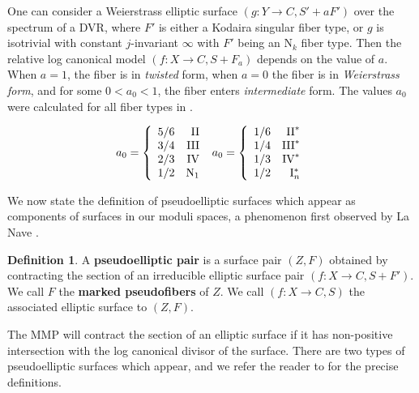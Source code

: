 \documentclass[11pt]{amsart}
\theoremstyle{definition}
\newtheorem{definition}[theorem]{Definition}
\theoremstyle{remark}
\begin{document}
	
	
	One can consider a Weierstrass elliptic surface $(g: Y \to C, S' + aF')$ over the spectrum of a DVR, where $F'$ is either a Kodaira singular fiber type, or $g$ is isotrivial with constant $j$-invariant $\infty$ with $F'$ being an $\mathrm{N}_k$ fiber type. Then the relative log canonical model $(f: X\to C, S + F_a)$ depends on the value of $a$. When $a = 1$, the fiber is in \emph{twisted} form, when $a = 0$ the fiber is in \emph{Weierstrass form}, and for some $0 < a_0 < 1$, the fiber enters \emph{intermediate} form. The values $a_0$ were calculated for all fiber types in \cite[Theorem 3.10]{master}.
	
	\begin{equation}\label{eq:a0}
		a_0 = \left\{ \begin{array}{lr}
			
			5/6 & \mathrm{II} \\ 3/4 & \mathrm{III} \\ 2/3 & \mathrm{IV} \\  1/2 & \mathrm{N}_1 \end{array}\right. \\
		\  a_0 = \left\{ \begin{array}{lr} 1/6 & \mathrm{II}^* \\ 
			1/4  & \mathrm{III}^* \\
			1/3 & \mathrm{IV}^* \\
			1/2 & \mathrm{I}_n^* \end{array}\right. 
	\end{equation}
	
	
	We now state the definition of pseudoelliptic surfaces which appear as components of surfaces in our moduli spaces, a phenomenon first observed by La Nave \cite{ln}.
	
	\begin{definition}\label{def:pseudo} A \textbf{pseudoelliptic pair} is a surface pair $(Z, F)$ obtained by contracting the section of an irreducible elliptic surface pair $(f: X \to C, S + F')$. We call $F$ the \textbf{marked pseudofibers} of $Z$. We call $(f: X \to C, S)$ the associated elliptic surface to $(Z, F)$. \end{definition}
	
	The MMP will contract the section of an elliptic surface if it has non-positive intersection with the log canonical divisor of the surface. There are two types of pseudoelliptic surfaces which appear, and we refer the reader to \cite[Definition 4.6, 4.7]{master} for the precise definitions. 
	
\end{document}
